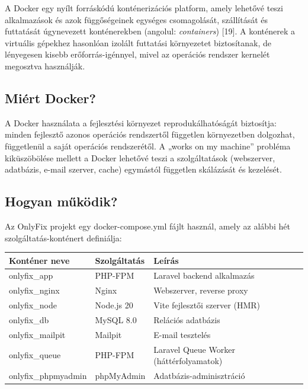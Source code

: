 A Docker egy nyílt forráskódú konténerizációs platform, amely lehetővé teszi alkalmazások és azok függőségeinek egységes csomagolását, szállítását és futtatását úgynevezett konténerekben (angolul: \emph{containers}) {[}19{]}. A konténerek a virtuális gépekhez hasonlóan izolált futtatási környezetet biztosítanak, de lényegesen kisebb erőforrás-igénnyel, mivel az operációs rendszer kernelét megosztva használják.

\subsection{Miért Docker?}\label{miuxe9rt-docker}

A Docker használata a fejlesztési környezet reprodukálhatóságát biztosítja: minden fejlesztő azonos operációs rendszertől független környezetben dolgozhat, függetlenül a saját operációs rendszerétől. A „works on my machine'' probléma kiküszöbölése mellett a Docker lehetővé teszi a szolgáltatások (webszerver, adatbázis, e-mail szerver, cache) egymástól független skálázását és kezelését.

\subsection{Hogyan működik?}\label{hogyan-mux171kuxf6dik-5}

Az OnlyFix projekt egy docker-compose.yml fájlt használ, amely az alábbi hét szolgáltatás-konténert definiálja:

{\def\LTcaptype{} %
\begin{longtable}[]{@{}
  >{\raggedright\arraybackslash}p{}
  >{\raggedright\arraybackslash}p{}
  >{\raggedright\arraybackslash}p{}@{}}
\toprule\noalign{}
\begin{minipage}[b]{\linewidth}\raggedright
Konténer neve
\end{minipage} & \begin{minipage}[b]{\linewidth}\raggedright
Szolgáltatás
\end{minipage} & \begin{minipage}[b]{\linewidth}\raggedright
Leírás
\end{minipage} \\
\midrule\noalign{}
\endhead
\bottomrule\noalign{}
\endlastfoot
onlyfix\_app & PHP-FPM & Laravel backend alkalmazás \\
onlyfix\_nginx & Nginx & Webszerver, reverse proxy \\
onlyfix\_node & Node.js 20 & Vite fejlesztői szerver (HMR) \\
onlyfix\_db & MySQL 8.0 & Relációs adatbázis \\
onlyfix\_mailpit & Mailpit & E-mail tesztelés \\
onlyfix\_queue & PHP-FPM & Laravel Queue Worker (háttérfolyamatok) \\
onlyfix\_phpmyadmin & phpMyAdmin & Adatbázis-adminisztráció \\
\end{longtable}
}

